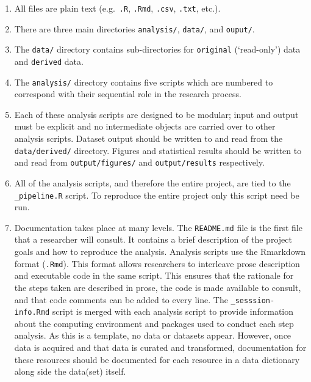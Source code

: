 \documentclass[
  letterpaper,
]{latex/krantz}
\providecommand{\tightlist}{%
  \setlength{\itemsep}{0pt}\setlength{\parskip}{0pt}}\usepackage{longtable,booktabs,array}
\begin{document}
\begin{enumerate}
\def\labelenumi{\arabic{enumi}.}
\tightlist
\item
  All files are plain text (e.g.~\texttt{.R}, \texttt{.Rmd},
  \texttt{.csv}, \texttt{.txt}, etc.).
\item
  There are three main directories \texttt{analysis/}, \texttt{data/},
  and \texttt{ouput/}.
\item
  The \texttt{data/} directory contains sub-directories for
  \texttt{original} (`read-only') data and \texttt{derived} data.
\item
  The \texttt{analysis/} directory contains five scripts which are
  numbered to correspond with their sequential role in the research
  process.
\item
  Each of these analysis scripts are designed to be modular; input and
  output must be explicit and no intermediate objects are carried over
  to other analysis scripts. Dataset output should be written to and
  read from the \texttt{data/derived/} directory. Figures and
  statistical results should be written to and read from
  \texttt{output/figures/} and \texttt{output/results} respectively.
\item
  All of the analysis scripts, and therefore the entire project, are
  tied to the \texttt{\_pipeline.R} script. To reproduce the entire
  project only this script need be run.
\item
  Documentation takes place at many levels. The \texttt{README.md} file
  is the first file that a researcher will consult. It contains a brief
  description of the project goals and how to reproduce the analysis.
  Analysis scripts use the Rmarkdown format (\texttt{.Rmd}). This format
  allows researchers to interleave prose description and executable code
  in the same script. This ensures that the rationale for the steps
  taken are described in prose, the code is made available to consult,
  and that code comments can be added to every line. The
  \texttt{\_sesssion-info.Rmd} script is merged with each analysis
  script to provide information about the computing environment and
  packages used to conduct each step analysis. As this is a template, no
  data or datasets appear. However, once data is acquired and that data
  is curated and transformed, documentation for these resources should
  be documented for each resource in a data dictionary along side the
  data(set) itself.
\end{enumerate}
\end{document}
